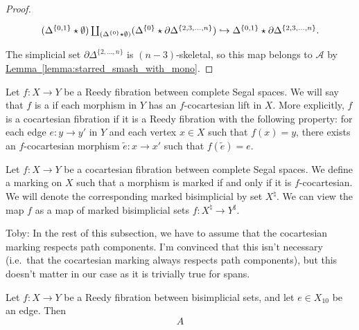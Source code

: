 \documentclass[main.tex]{subfiles}
\begin{document}
\begin{proof}
  \begin{equation*}
    \begin{tikzcd}
      (\Delta^{\{0, 1\}} \star \emptyset) \coprod_{(\Delta^{\{0\}} \star \emptyset)} (\Delta^{\{0\}} \star \partial \Delta^{\{2, 3, \ldots, n\}}) \hookrightarrow \Delta^{\{0, 1\}} \star \partial \Delta^{\{2, 3, \ldots, n\}}.
    \end{tikzcd}
  \end{equation*}
  The simplicial set $\partial \Delta^{\{2, \ldots, n\}}$ is $(n-3)$-skeletal, so this map belongs to $\mathcal{A}$ by \hyperref[lemma:starred_smash_with_mono]{Lemma~\ref*{lemma:starred_smash_with_mono}}.
\end{proof}

\begin{definition}
  \label{def:cocartesian_fibration_between_complete_segal_spaces}
  Let $f\colon X \to Y$ be a Reedy fibration between complete Segal spaces. We will say that $f$ is a  if each morphism in $Y$ has an $f$-cocartesian lift in $X$. More explicitly, $f$ is a cocartesian fibration if it is a Reedy fibration with the following property: for each edge $e\colon y \to y'$ in $Y$ and each vertex $x \in X$ such that $f(x) = y$, there exists an $f$-cocartesian morphism $\tilde{e}\colon x \to x'$ such that $f(\tilde{e}) = e$.
\end{definition}

\begin{definition}
  \label{def:cocoartesian_marking_on_complete_segal_spaces}
  Let $f\colon X \to Y$ be a cocartesian fibration between complete Segal spaces. We define a marking on $X$ such that a morphism is marked if and only if it is $f$-cocartesian. We will denote the corresponding marked bisimplicial by set $X^{\natural}$. We can view the map $f$ as a map of marked bisimplicial sets $f\colon X^{\natural} \to Y^{\sharp}$.
\end{definition}

\begin{note}
  Toby: In the rest of this subsection, we have to assume that the cocartesian marking respects path components. I'm convinced that this isn't necessary (i.e.\ that the cocartesian marking always respects path components), but this doesn't matter in our case as it is trivially true for spans.
\end{note}

\begin{lemma}
  Let $f\colon X \to Y$ be a Reedy fibration between bisimplicial sets, and let $e \in X_{10}$ be an edge. Then
  \begin{equation*}
    A 
  \end{equation*}
\end{lemma}
\end{document}
